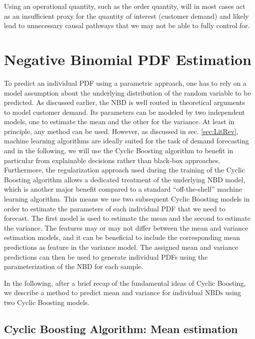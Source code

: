 \documentclass[BCOR=1mm, DIV=calc,10pt,
twoside=true,
twocolumn,
headings=normal]{scrartcl}
\begin{document}
Using an operational quantity, such as the order quantity, will in most cases act as an insufficient proxy for the quantity of interest (customer demand) and likely lead to unnecessary causal pathways that we may not be able to fully control for. 


\section{Negative Binomial PDF Estimation}
\label{sec:pdfEstimation}

To predict an individual PDF using a parametric approach, one has to rely on a model assumption about the underlying distribution of the random variable to be predicted. As discussed earlier, the NBD is well routed in theoretical arguments to model customer demand. Its parameters can be modeled by two independent models, one to estimate the mean and the other for the variance. At least in principle, any method can be used. However, as discussed in sec. \ref{sec:LitRev}, machine learning algorithms are ideally suited for the task of demand forecasting and in the following, we will use the Cyclic Boosting algorithm to benefit in particular from explainable decisions rather than black-box approaches. Furthermore, the regularization approach used during the training of the Cyclic Boosting algorithm allows a dedicated treatment of the underlying NBD model, which is another major benefit compared to a standard ``off-the-shelf'' machine learning algorithm. This means we use two subsequent Cyclic Boosting models in order to estimate the parameters of each individual PDF that we need to forecast. The first model is used to estimate the mean and the second to estimate the variance. The features may or may not differ between the mean and variance estimation models, and it can be beneficial to include the corresponding mean predictions as feature in the variance model. The assigned mean and variance predictions can then be used to generate individual PDFs using the parameterization of the NBD for each sample.

In the following, after a brief recap of the fundamental ideas of Cyclic Boosting, we describe a method to predict mean and variance for individual NBDs using two Cyclic Boosting models.

\subsection{Cyclic Boosting Algorithm: Mean estimation}
\label{sec:CB}
\end{document}
